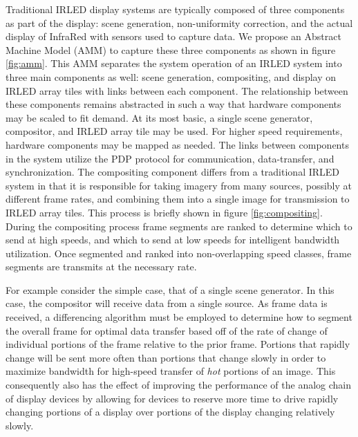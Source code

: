 Traditional IRLED display systems are typically composed of three components as part of the display: scene generation, non-uniformity correction, and the actual display of InfraRed with sensors used to capture data. We propose an Abstract Machine Model (AMM) to capture these three components as shown in figure \ref{fig:amm}. This AMM separates the system operation of an IRLED system into three main components as well: scene generation, compositing, and display on IRLED array tiles with links between each component. The relationship between these components remains abstracted in such a way that hardware components may be scaled to fit demand. At its most basic, a single scene generator, compositor, and IRLED array tile may be used. For higher speed requirements, hardware components may be mapped as needed. The links between components in the system utilize the PDP protocol for communication, data-transfer, and synchronization. The compositing component differs from a traditional IRLED system in that it is responsible for taking imagery from many sources, possibly at different frame rates, and combining them into a single image for transmission to IRLED array tiles. This process is briefly shown in figure \ref{fig:compositing}. During the compositing process frame segments are ranked to determine which to send at high speeds, and which to send at low speeds for intelligent bandwidth utilization. Once segmented and ranked into non-overlapping speed classes, frame segments are transmits at the necessary rate.

For example consider the simple case, that of a single scene generator. In this case, the compositor will receive data from a single source. As frame data is received, a differencing algorithm must be employed to determine how to segment the overall frame for optimal data transfer based off of the rate of change of individual portions of the frame relative to the prior frame. Portions that rapidly change will be sent more often than portions that change slowly in order to maximize bandwidth for high-speed transfer of {\it hot} portions of an image. This consequently also has the effect of improving the performance of the analog chain of display devices by allowing for devices to reserve more time to drive rapidly changing portions of a display over portions of the display changing relatively slowly.

